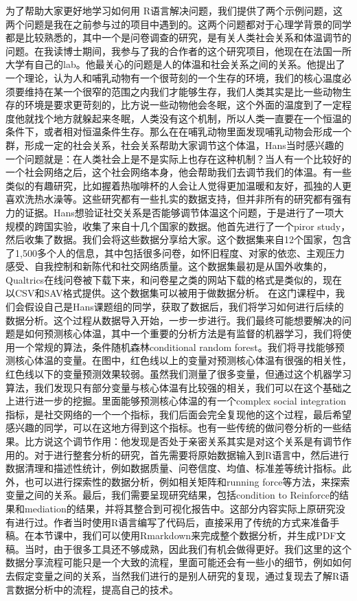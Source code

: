\documentclass[
  oneside]{book}
\begin{document}
为了帮助大家更好地学习如何用
R语言解决问题，我们提供了两个示例问题，这两个问题是我在之前参与过的项目中遇到的。这两个问题都对于心理学背景的同学都是比较熟悉的，其中一个是问卷调查的研究，是有关人类社会关系和体温调节的问题。在我读博士期间，我参与了我的合作者的这个研究项目，他现在在法国一所大学有自己的lab。他最关心的问题是人的体温和社会关系之间的关系。他提出了一个理论，认为人和哺乳动物有一个很苛刻的一个生存的环境，我们的核心温度必须要维持在某一个很窄的范围之内我们才能够生存，我们人类其实是比一些动物生存的环境是要求更苛刻的，比方说一些动物他会冬眠，这个外面的温度到了一定程度他就找个地方就躲起来冬眠，人类没有这个机制，所以人类一直要在一个恒温的条件下，或者相对恒温条件生存。那么在在哺乳动物里面发现哺乳动物会形成一个群，形成一定的社会关系，社会关系帮助大家调节这个体温，Hans当时感兴趣的一个问题就是：在人类社会上是不是实际上也存在这种机制？当人有一个比较好的一个社会网络之后，这个社会网络本身，他会帮助我们去调节我们的体温。有一些类似的有趣研究，比如握着热咖啡杯的人会让人觉得更加温暖和友好，孤独的人更喜欢洗热水澡等。这些研究都有一些扎实的数据支持，但并非所有的研究都有强有力的证据。Hans想验证社交关系是否能够调节体温这个问题，于是进行了一项大规模的跨国实验，收集了来自十几个国家的数据。他首先进行了一个piror
study，然后收集了数据。我们会将这些数据分享给大家。这个数据集来自12个国家，包含了1,500多个人的信息，其中包括很多问卷，如怀旧程度、对家的依恋、主观压力感受、自我控制和新陈代和社交网络质量。这个数据集最初是从国外收集的，Qualtrics在线问卷被下载下来，和问卷星之类的网站下载的格式是类似的，现在以CSV和SAV格式提供。这个数据集可以被用于做数据分析。
在这门课程中，我们会假设自己是Hans课题组的同学，获取了数据后，我们将学习如何进行后续的数据分析。这个过程从数据导入开始，一步一步进行。我们最终可能想要解决的问题是如何预测核心体温，其中一个重要的分析方法是有监督的机器学习，我们将使用一个常规的算法，条件随机森林conditional
random
forest。我们将寻找能够预测核心体温的变量。在图中，红色线以上的变量对预测核心体温有很强的相关性，红色线以下的变量预测效果较弱。虽然我们测量了很多变量，但通过这个机器学习算法，我们发现只有部分变量与核心体温有比较强的相关，我们可以在这个基础之上进行进一步的挖掘。里面能够预测核心体温的有一个complex
social
integration指标，是社交网络的一个一个指标，我们后面会完全复现他的这个过程，最后希望感兴趣的同学，可以在这地方得到这个指标。也有一些传统的做问卷分析的一些结果。比方说这个调节作用：他发现是否处于亲密关系其实是对这个关系是有调节作用的。对于进行整套分析的研究，首先需要将原始数据输入到R语言中，然后进行数据清理和描述性统计，例如数据质量、问卷信度、均值、标准差等统计指标。此外，也可以进行探索性的数据分析，例如相关矩阵和running
force等方法，来探索变量之间的关系。最后，我们需要呈现研究结果，包括condition
to
Reinforce的结果和mediation的结果，并将其整合到可视化报告中。这部分内容实际上原研究没有进行过。作者当时使用R语言编写了代码后，直接采用了传统的方式来准备手稿。在本节课中，我们可以使用Rmarkdown来完成整个数据分析，并生成PDF文稿。当时，由于很多工具还不够成熟，因此我们有机会做得更好。我们这里的这个数据分享流程可能只是一个大致的流程，里面可能还会有一些小的细节，例如如何去假定变量之间的关系，当然我们进行的是别人研究的复现，通过复现去了解R语言数据分析中的流程，提高自己的技术。
\end{document}
